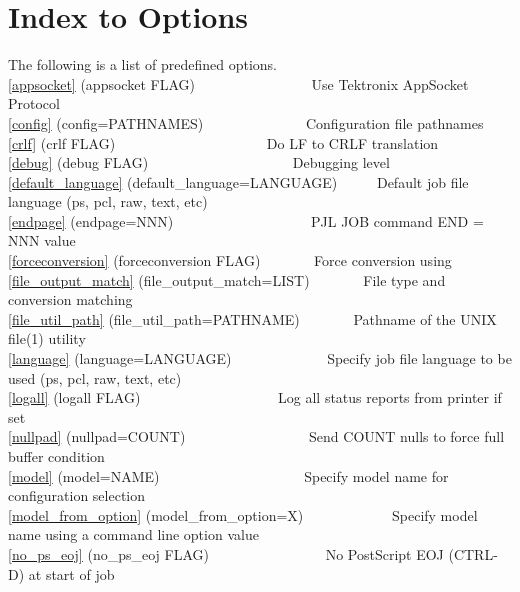 \documentclass[a4paper]{article}
\begin{document}
\section{Index to Options}

The following is a list of predefined options. \\ 
{\ttfamily \ref{appsocket} {(appsocket FLAG)}}{\ttfamily ~~~~~~~~~~~~~~~~} Use Tektronix AppSocket Protocol \\ 
{\ttfamily \ref{config} {(config=PATHNAMES)}}{\ttfamily ~~~~~~~~~~~~~~} Configuration file pathnames \\ 
{\ttfamily \ref{crlf} {(crlf FLAG)}}{\ttfamily ~~~~~~~~~~~~~~~~~~~~~} Do LF to CRLF translation \\ 
{\ttfamily \ref{debug} {(debug FLAG)}}{\ttfamily ~~~~~~~~~~~~~~~~~~~~} Debugging level \\ 
{\ttfamily \ref{default_language} {(default\_language=LANGUAGE)}}{\ttfamily ~~~~~} Default job file language (ps, pcl, raw, text, etc) \\ 
{\ttfamily \ref{endpage} {(endpage=NNN)}}{\ttfamily ~~~~~~~~~~~~~~~~~~~} PJL JOB command END = NNN value \\ 
{\ttfamily \ref{forceconversion} {(forceconversion FLAG)}}{\ttfamily ~~~~~~~} Force conversion using   \\ 
{\ttfamily \ref{file_output_match} {(file\_output\_match=LIST)}}{\ttfamily ~~~~~~~} File type and conversion matching\\ 
{\ttfamily \ref{file_util_path} {(file\_util\_path=PATHNAME)}}{\ttfamily ~~~~~~~} Pathname of the UNIX file(1) utility \\ 
{\ttfamily \ref{language} {(language=LANGUAGE)}}{\ttfamily ~~~~~~~~~~~~~} Specify job file language to be used (ps, pcl, raw, text, etc) \\ 
{\ttfamily \ref{logall} {(logall FLAG)}}{\ttfamily ~~~~~~~~~~~~~~~~~~~} Log all status reports from printer if set \\ 
{\ttfamily \ref{nullpad} {(nullpad=COUNT)}}{\ttfamily ~~~~~~~~~~~~~~~~~} Send COUNT nulls to force full buffer condition \\ 
{\ttfamily \ref{model} {(model=NAME)}}{\ttfamily ~~~~~~~~~~~~~~~~~~~~} Specify model name for configuration selection \\ 
{\ttfamily \ref{model_from_option} {(model\_from\_option=X)}}{\ttfamily ~~~~~~~~~~~~} Specify model name using a command line option value \\ 
{\ttfamily \ref{no_ps_eoj} {(no\_ps\_eoj FLAG)}}{\ttfamily ~~~~~~~~~~~~~~~~} No PostScript EOJ (CTRL-D) at start of job \\ 
\end{document}
